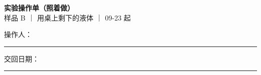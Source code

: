 \documentclass[a4paper, 12pt]{ctexart}
\begin{document}
\begin{center}
{\LARGE\bfseries 实验操作单（照着做）}\\[6pt]
{\large 样品 B ｜ 用桌上剩下的液体 ｜ 09-23 起}\\[4pt]
{\normalsize 操作人：\rule{3.5cm}{0.4pt} \quad 交回日期：\rule{3cm}{0.4pt}}
\end{center}


\end{document}
